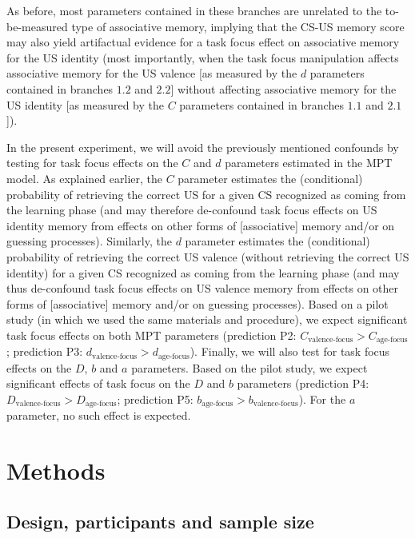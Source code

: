 \documentclass[
  doc,floatsintext]{apa6}
\begin{document}
As before, most parameters contained in these branches are unrelated to the to-be-measured type of associative memory, implying that the CS-US memory score may also yield artifactual evidence for a task focus effect on associative memory for the US identity (most importantly, when the task focus manipulation affects associative memory for the US valence {[}as measured by the \(d\) parameters contained in branches \(1.2\) and \(2.2\){]} without affecting associative memory for the US identity {[}as measured by the \(C\) parameters contained in branches \(1.1\) and \(2.1\){]}).

In the present experiment, we will avoid the previously mentioned confounds by testing for task focus effects on the \(C\) and \(d\) parameters estimated in the MPT model.
As explained earlier, the \(C\) parameter estimates the (conditional) probability of retrieving the correct US for a given CS recognized as coming from the learning phase (and may therefore de-confound task focus effects on US identity memory from effects on other forms of {[}associative{]} memory and/or on guessing processes).
Similarly, the \(d\) parameter estimates the (conditional) probability of retrieving the correct US valence (without retrieving the correct US identity) for a given CS recognized as coming from the learning phase (and may thus de-confound task focus effects on US valence memory from effects on other forms of {[}associative{]} memory and/or on guessing processes).
Based on a pilot study (in which we used the same materials and procedure), we expect significant task focus effects on both MPT parameters (prediction P2: \(C_\textrm{valence-focus}>C_\textrm{age-focus}\); prediction P3: \(d_\textrm{valence-focus}>d_\textrm{age-focus}\)).
Finally, we will also test for task focus effects on the \(D\), \(b\) and \(a\) parameters.
Based on the pilot study, we expect significant effects of task focus on the \(D\) and \(b\) parameters (prediction P4: \(D_\textrm{valence-focus}>D_\textrm{age-focus}\); prediction P5: \(b_\textrm{age-focus}>b_\textrm{valence-focus}\)).
For the \(a\) parameter, no such effect is expected.

\section{Methods}\label{methods}

\subsection{Design, participants and sample size}\label{design-participants-and-sample-size}
\end{document}
